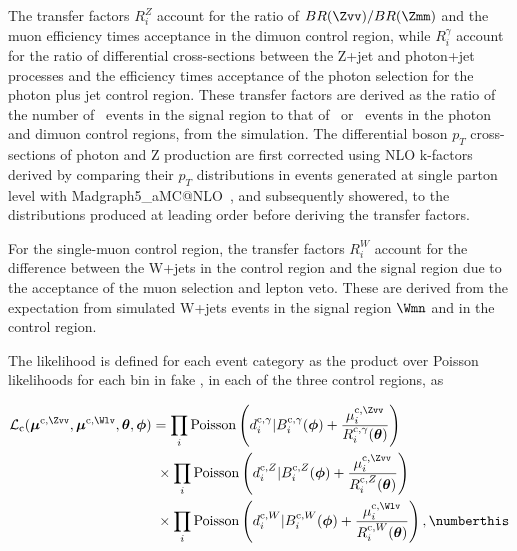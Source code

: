 The transfer factors $R^{Z}_{i}$ account for the ratio of $BR(\Zvv)/BR(\Zmm)$ and 
the muon efficiency times acceptance in the dimuon control region, while $R^{\gamma}_{i}$ account for the ratio of differential 
cross-sections between the Z+jet and photon+jet processes and the efficiency times acceptance of the photon selection for the photon 
plus jet control region. These transfer factors are derived as the ratio of the number of \Zvvjets ~events in the signal region 
to that of \phojets~or \Zmmjets~events in the photon and dimuon control regions, from the simulation.
The differential boson $p_{T}$ cross-sections of photon and Z production are first corrected using NLO k-factors derived by  
comparing their $p_{T}$ distributions in events generated at single parton level with Madgraph5\_aMC@NLO~\cite{amcatnlo}, and subsequently showered,  
to the distributions produced at leading order before deriving the transfer factors. 

For the single-muon control region, the transfer factors $R^{W}_{i}$ account for the difference between the 
W+jets in the control region and the signal region due to the acceptance of the muon selection and lepton veto.
These are derived from the expectation from simulated W+jets events in the signal region $\Wmn$ and in the control region.

The likelihood is defined for each event category as the product over Poisson likelihoods for each bin in fake \ETm, in each of the three control regions, as

\begin{align*}\label{eqn:cancdlh}
\mathcal{L}_{\textrm{c}}(\boldsymbol{\mu}^{\textrm{c},\Zvv},\boldsymbol{\mu}^{\textrm{c},\Wlv},\boldsymbol{\theta},\boldsymbol{\phi}) &=        
                \prod_{i} \mathrm{Poisson}\left(d^{\textrm{c},\gamma}_{i} |B^{\textrm{c},\gamma}_{i}(\boldsymbol{\phi}) +\frac{ \mu^{\textrm{c},\Zvv}_{i} }{R^{\textrm{c},\gamma}_{i}(\boldsymbol{\theta})}   \right) \\
       &~\times \prod_{i} \mathrm{Poisson}\left(d^{\textrm{c},Z}_{i}      |B^{\textrm{c},Z}_{i}(\boldsymbol{\phi})      +\frac{ \mu^{\textrm{c},\Zvv}_{i} }{R^{\textrm{c},Z}_{i}     (\boldsymbol{\theta})}       \right ) \\
       &~\times \prod_{i} \mathrm{Poisson}\left(d^{\textrm{c},W}_{i}      |B^{\textrm{c},W}_{i}(\boldsymbol{\phi})      +\frac{ \mu^{\textrm{c},\Wlv}_{i} }{R^{\textrm{c},W}_{i}     (\boldsymbol{\theta})}       \right), \numberthis\label{eqn:candclh}
\end{align*}


